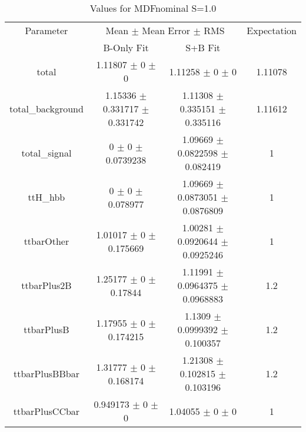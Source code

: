 \begin{table}
\centering
\caption{Values for MDFnominal S=1.0}
\begin{tabular}{cccc}
\toprule
Parameter & \multicolumn{2}{c}{Mean $\pm$ Mean Error $\pm$ RMS} & Expectation\\
 & B-Only Fit & S+B Fit & \\
\midrule
total & \num{1.11807} $\pm$ \num{0} $\pm$ \num{0} & \num{1.11258} $\pm$ \num{0} $\pm$ \num{0} & \num{1.11078}\\
total\_background & \num{1.15336} $\pm$ \num{0.331717} $\pm$ \num{0.331742} & \num{1.11308} $\pm$ \num{0.335151} $\pm$ \num{0.335116} & \num{1.11612}\\
total\_signal & \num{0} $\pm$ \num{0} $\pm$ \num{0.0739238} & \num{1.09669} $\pm$ \num{0.0822598} $\pm$ \num{0.082419} & \num{1}\\
ttH\_hbb & \num{0} $\pm$ \num{0} $\pm$ \num{0.078977} & \num{1.09669} $\pm$ \num{0.0873051} $\pm$ \num{0.0876809} & \num{1}\\
ttbarOther & \num{1.01017} $\pm$ \num{0} $\pm$ \num{0.175669} & \num{1.00281} $\pm$ \num{0.0920644} $\pm$ \num{0.0925246} & \num{1}\\
ttbarPlus2B & \num{1.25177} $\pm$ \num{0} $\pm$ \num{0.17844} & \num{1.11991} $\pm$ \num{0.0964375} $\pm$ \num{0.0968883} & \num{1.2}\\
ttbarPlusB & \num{1.17955} $\pm$ \num{0} $\pm$ \num{0.174215} & \num{1.1309} $\pm$ \num{0.0999392} $\pm$ \num{0.100357} & \num{1.2}\\
ttbarPlusBBbar & \num{1.31777} $\pm$ \num{0} $\pm$ \num{0.168174} & \num{1.21308} $\pm$ \num{0.102815} $\pm$ \num{0.103196} & \num{1.2}\\
ttbarPlusCCbar & \num{0.949173} $\pm$ \num{0} $\pm$ \num{0} & \num{1.04055} $\pm$ \num{0} $\pm$ \num{0} & \num{1}\\
\bottomrule
\end{tabular}
\end{table}
